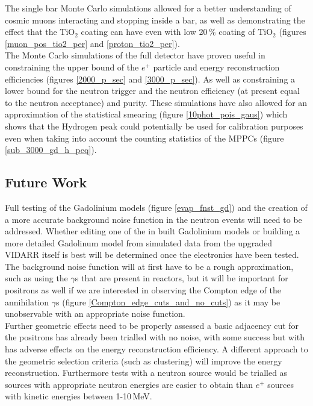\documentclass[12pt,a4paper]{article}
\begin{document}
The single bar Monte Carlo simulations allowed for a better understanding of cosmic muons interacting and stopping inside a bar, as well as demonstrating the effect that the TiO$_2$ coating can have even with low 20\,\% coating of TiO$_2$ (figures \ref{muon_pos_tio2_per} and \ref{proton_tio2_per}). \\

The Monte Carlo simulations of the full detector have proven useful in constraining the upper bound of the $e^+$ particle and energy reconstruction efficiencies (figures \ref{2000_p_sec} and \ref{3000_p_sec}). As well as constraining a lower bound for the neutron trigger and the neutron efficiency (at present equal to the neutron acceptance) and purity. These simulations have also allowed for an approximation of the statistical smearing (figure \ref{10phot_pois_gaus}) which shows that the Hydrogen peak could potentially be used for calibration purposes even when taking into account the counting statistics of the MPPCs (figure \ref{sub_3000_gd_h_peq}).

\subsection{Future Work}
Full testing of the Gadolinium models (figure \ref{evap_fnst_gd}) and the creation of a more accurate background noise function in the neutron events will need to be addressed. Whether editing one of the in built Gadolinium models or building a more detailed Gadolinum model from simulated data from the upgraded VIDARR itself is best will be determined once the electronics have been tested. The background noise function will at first have to be a rough approximation, such as using the $\gamma$s that are present in reactors, but it will be important for positrons as well if we are interested in observing the Compton edge of the annihilation $\gamma$s (figure \ref{Compton_edge_cuts_and_no_cuts}) as it may be unobservable with an appropriate noise function. \\

Further geometric effects need to be properly assessed a basic adjacency cut for the positrons has already been trialled with no noise, with some success but with has adverse effects on the energy reconstruction efficiency. A different approach to the geometric selection criteria (such as clustering) will improve the energy reconstruction. Furthermore tests with a neutron source would be trialled as sources with appropriate neutron energies are easier to obtain than $e^+$ sources with kinetic energies between 1-10\,MeV.\\
\end{document}
